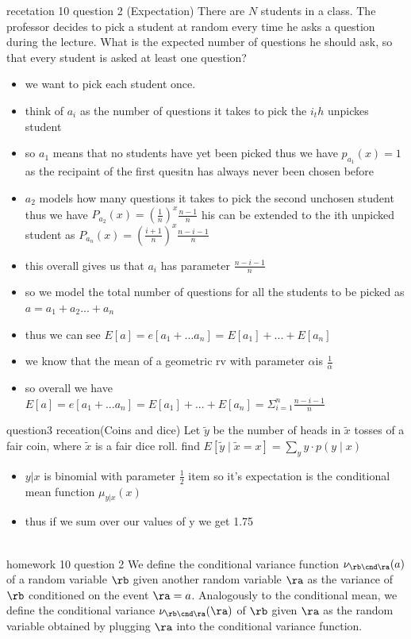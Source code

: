 \documentclass[10pt]{article}
\begin{document}
recetation 10 question 2
(Expectation) There are $N$ students in a class. The professor decides to pick a student at random every time he asks a question during the lecture. What is the expected number of questions he should ask, so that every student is asked at least one question?
\begin{itemize}
    \item we want to pick each student once. 
    \item think of $a_i$ as the number of questions it takes to pick the $i_th$ unpickes student 
    \item so $a_1$ means that no students have yet been picked thus we have $p_{a_{1}}(x)=1$ as the recipaint of the first quesitn has always never been chosen before 
    \item $a_2$ models how many questions it takes to pick the second unchosen student thus we have $P_{a_2}(x)=(\frac{1}{n})^x\frac{n-1}{n}$
    \itemt his can be extended to the ith unpicked student as $P_{a_n}(x)=(\frac{i+1}{n})^x\frac{n-i-1}{n}$
    \item this overall gives us that $a_i$ has parameter $\frac{n-i-1}{n}$
    \item so we model the total number of questions for all the students to be picked as $a=a_1+a_2...+a_n$
    \item thus we can see $E[a]=e[a_1+...a_n]=E[a_1]+...+E[a_n]$ 
    \item we know that the mean of a geometric rv with parameter $\alpha $is $\frac{1}{\alpha}$
    \item so overall we have $E[a]=e[a_1+...a_n]=E[a_1]+...+E[a_n]=\Sigma_{i=1}^{n}\frac{n-i-1}{n}$
\end{itemize}
question3 receation(Coins and dice) Let $\tilde{y}$ be the number of heads in $\tilde{x}$ tosses of a fair coin, where $\tilde{x}$ is a fair dice roll.
find  $E[\tilde{y} \mid \tilde{x} = x] = \sum_y y \cdot p(y \mid x)$ 
\begin{itemize}
    \item $y|x$ is binomial with parameter $\frac{1}{2}$ item so it's expectation is the conditional mean function $\mu_{y|x}(x)$
    \item thus if we sum over our values of y we get 1.75
\end{itemize}
\\
homework 10 question 2 
We define the conditional variance function $\nu_{\rb \cnd \ra}(a)$ of a random variable $\rb$ given another random variable $\ra$ as the variance of $\rb$ conditioned on the event $\ra = a$. Analogously to the conditional mean, we define the conditional variance $\nu_{\rb \cnd \ra}(\ra)$ of $\rb$ given $\ra$ as the random variable obtained by plugging $\ra$ into the conditional variance function. 
\end{document}
